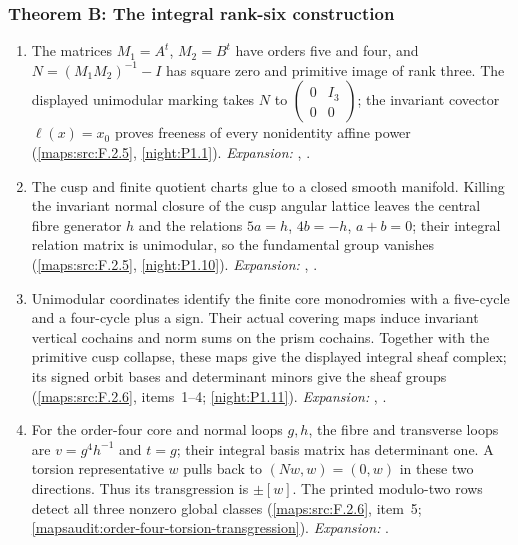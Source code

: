 \subsubsection*{Theorem B: The integral rank-six construction}
\begin{enumerate}[label=\arabic*.,leftmargin=*]
\item\hypertarget{step-V-B-1}{} The matrices $M_1=A^t$, $M_2=B^t$ have orders five and four, and
  $N=(M_1M_2)^{-1}-I$ has square zero and primitive image of rank three.
  The displayed unimodular marking takes $N$ to
  $\left(\begin{smallmatrix}0&I_3\\0&0\end{smallmatrix}\right)$;
  the invariant covector $\ell(x)=x_0$ proves freeness of every
  nonidentity affine power
  (\cref{maps:src:F.2.5}, \cref{night:P1.1}).
\textit{Expansion:} , .
\item\hypertarget{step-V-B-2}{} The cusp and finite quotient charts glue to a closed smooth
  manifold.  Killing the invariant normal closure of the cusp angular lattice
  leaves the central fibre generator $h$ and the relations $5a=h$, $4b=-h$, $a+b=0$;
  their integral relation matrix is unimodular, so the fundamental
  group vanishes (\cref{maps:src:F.2.5}, \cref{night:P1.10}).
\textit{Expansion:} , .
\item\hypertarget{step-V-B-3}{} Unimodular coordinates identify the finite core monodromies
  with a five-cycle and a four-cycle plus a sign.  Their actual
  covering maps induce invariant vertical cochains and norm sums
  on the prism cochains.  Together with the primitive cusp collapse,
  these maps give the displayed integral sheaf complex; its signed
  orbit bases and determinant minors give the sheaf groups
  (\cref{maps:src:F.2.6}, items~1--4; \cref{night:P1.11}).
\textit{Expansion:} , .
\item\hypertarget{step-V-B-4}{} For the order-four core and normal loops $g,h$, the fibre and
  transverse loops are $v=g^4h^{-1}$ and $t=g$; their integral
  basis matrix has determinant one.  A torsion representative $w$
  pulls back to $(Nw,w)=(0,w)$ in these two directions.
  Thus its transgression is $\pm[w]$.  The printed modulo-two
  rows detect all three nonzero global classes
  (\cref{maps:src:F.2.6}, item~5;
  \cref{mapsaudit:order-four-torsion-transgression}).
\textit{Expansion:} .

\end{enumerate}
